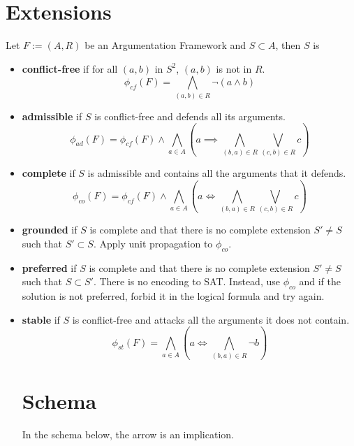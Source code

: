 \documentclass[11pt]{article}
\begin{document}
\section{Extensions}
Let $F := (A, R)$ be an Argumentation Framework and $S \subset A$, then $S$ is
\begin{itemize}

\item \textbf{conflict-free} if for all $(a, b)$ in $S^2$, $(a, b)$ is not in $R$.
$$
\phi_{cf}(F) = \bigwedge_{(a, b) \in R} \lnot (a \land b)
$$
\item \textbf{admissible} if $S$ is conflict-free and defends all its arguments.
$$
\phi_{ad}(F) = \phi_{cf}(F) \land \bigwedge_{a \in A} \left( a \implies \bigwedge_{(b, a) \in R} \bigvee_{(c, b) \in R} c \right)
$$
\item \textbf{complete} if $S$ is admissible and contains all the arguments that it defends.
$$
\phi_{co}(F) = \phi_{cf}(F) \land \bigwedge_{a \in A} \left( a \iff \bigwedge_{(b, a) \in R} \bigvee_{(c, b) \in R} c \right)
$$
\item \textbf{grounded} if $S$ is complete and that there is no complete extension $S' \neq S$ such that $S' \subset S$.
Apply unit propagation to $\phi_{co}$.
\item \textbf{preferred} if $S$ is complete and that there is no complete extension $S' \neq S$ such that $S \subset S'$.
There is no encoding to SAT. Instead, use $\phi_{co}$ and if the solution is not preferred, forbid it in the logical formula and try again.
\item \textbf{stable} if $S$ is conflict-free and attacks all the arguments it does not contain.
$$
\phi_{st}(F) = \bigwedge_{a \in A}\left(a \iff \bigwedge_{(b, a)\in R} \lnot b\right)
$$

\newpage
\section{Schema}
In the schema below, the arrow is an implication. \\ \\

\end{itemize}
\end{document}
